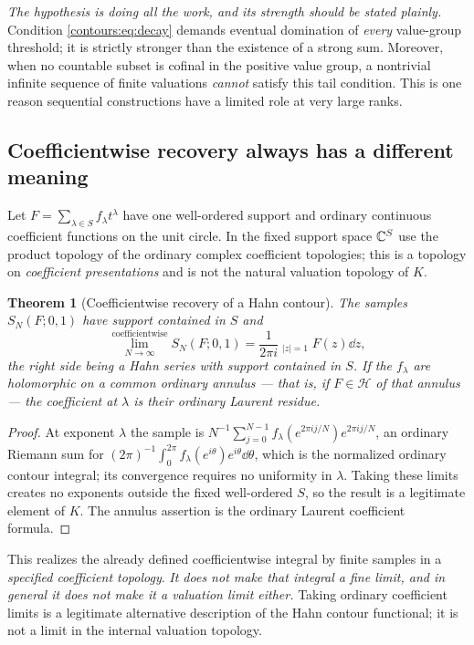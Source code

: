 \documentclass[11pt,letterpaper]{article}
\newtheorem{theorem}{Theorem}[section]
\theoremstyle{definition}
\theoremstyle{remark}
\newcommand{\HH}{\mathcal H}\newcommand{\A}{\mathscr A}\newcommand{\OO}{\mathcal O}
\newcommand{\HCoint}{\mathop{\oint^{\!H}}\nolimits}
\numberwithin{equation}{section}
\begin{document}
\emph{The hypothesis is doing all the work, and its strength should be stated
plainly.} Condition \eqref{contours:eq:decay} demands eventual domination of
\emph{every} value-group threshold; it is strictly stronger than the existence of a
strong sum. Moreover, when no countable subset is cofinal in the positive value
group, a nontrivial infinite sequence of finite valuations \emph{cannot} satisfy
this tail condition. This is one reason sequential constructions have a limited role
at very large ranks.

\subsection{Coefficientwise recovery always has a different meaning}
Let $F=\sum_{\lambda\in S}f_\lambda t^\lambda$ have one well-ordered support and
ordinary continuous coefficient functions on the unit circle. In the fixed support
space $\mathbb C^S$ use the product topology of the ordinary complex coefficient
topologies; this is a topology on \emph{coefficient presentations} and is not the
natural valuation topology of $K$.

\begin{theorem}[Coefficientwise recovery of a Hahn contour]
\label{contours:thm:sampling}
The samples $S_N(F;0,1)$ have support contained in $S$ and
\begin{equation}\label{contours:eq:coefflimit}
  \operatorname*{lim}_{N\to\infty}^{\mathrm{coefficientwise}} S_N(F;0,1)
  =\frac1{2\pi i}\HCoint_{|z|=1}F(z)\dd z ,
\end{equation}
the right side being a Hahn series with support contained in $S$. If the
$f_\lambda$ are holomorphic on a common ordinary annulus --- that is, if
$F\in\HH$ of that annulus --- the coefficient at $\lambda$ is their ordinary Laurent
residue.
\end{theorem}
\begin{proof}
At exponent $\lambda$ the sample is
$N^{-1}\sum_{j=0}^{N-1}f_\lambda(e^{2\pi ij/N})e^{2\pi ij/N}$, an ordinary Riemann
sum for $(2\pi)^{-1}\int_0^{2\pi}f_\lambda(e^{i\theta})e^{i\theta}\dd\theta$, which
is the normalized ordinary contour integral; its convergence requires no uniformity
in $\lambda$. Taking these limits creates no exponents outside the fixed
well-ordered $S$, so the result is a legitimate element of $K$. The annulus
assertion is the ordinary Laurent coefficient formula.
\end{proof}

This realizes the already defined coefficientwise integral by finite samples in a
\emph{specified coefficient topology}. \emph{It does not make that integral a fine
limit, and in general it does not make it a valuation limit either.} Taking ordinary
coefficient limits is a legitimate alternative description of the Hahn contour
functional; it is not a limit in the internal valuation topology.
\end{document}
